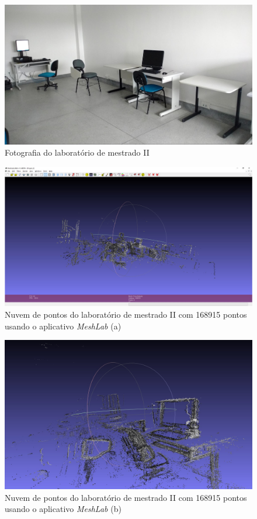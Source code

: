 \begin{figure}[H]
	\centering
		\includegraphics[width= \textwidth]{Imagens/figura4-15.jpg}
	\caption{Fotografia do laboratório de mestrado II}
	\label{fig4:15}
\end{figure}

\begin{figure}[H]
	\centering
		\includegraphics[width= \textwidth]{Imagens/figura4-13.jpg}
	\caption{Nuvem de pontos do laboratório de mestrado II com 168915 pontos usando o aplicativo \textit{MeshLab} (a)}
	\label{fig4:13}
\end{figure}

\begin{figure}[H]
	\centering
		\includegraphics[width= \textwidth]{Imagens/figura4-14.jpg}
	\caption{Nuvem de pontos do laboratório de mestrado II com 168915 pontos usando o aplicativo \textit{MeshLab} (b)}
	\label{fig4:14}
\end{figure}


